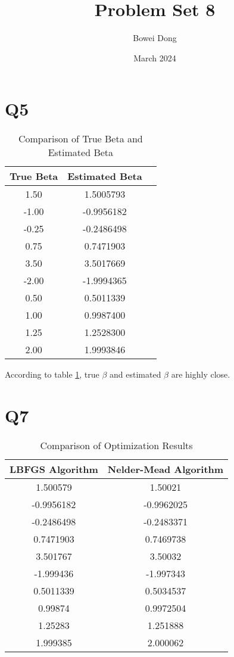 \documentclass{article}
\title{Problem Set 8}
\author{Bowei Dong }
\date{March 2024}
\begin{document}
\maketitle

\section*{Q5}

\begin{table}[h]
\centering
\caption{Comparison of True Beta and Estimated Beta}
\label{tab:beta_comparison}
\begin{tabular}{|cc|c}
\hline
\textbf{True Beta} & \textbf{Estimated Beta} \\
\hline
1.50 & 1.5005793 \\
-1.00 & -0.9956182 \\
-0.25 & -0.2486498 \\
0.75 & 0.7471903 \\
3.50 & 3.5017669 \\
-2.00 & -1.9994365 \\
0.50 & 0.5011339 \\
1.00 & 0.9987400 \\
1.25 & 1.2528300 \\
2.00 & 1.9993846 \\
\hline
\end{tabular}
\end{table}
According to table \ref{tab:beta_comparison}, true $\beta$ and estimated $\beta$ are highly close. 

\section*{Q7}






\begin{table}[h]
\centering
\caption{Comparison of Optimization Results}
\label{tab:comparison_results}
\begin{tabular}{|cc|}
\hline
\textbf{LBFGS Algorithm} & \textbf{Nelder-Mead Algorithm} \\
\hline
1.500579 & 1.50021 \\
-0.9956182 & -0.9962025 \\
-0.2486498 & -0.2483371 \\
0.7471903 & 0.7469738 \\
3.501767 & 3.50032 \\
-1.999436 & -1.997343 \\
0.5011339 & 0.5034537 \\
0.99874 & 0.9972504 \\
1.25283 & 1.251888 \\
1.999385 & 2.000062 \\
\hline
\end{tabular}
\end{table}
\end{document}

